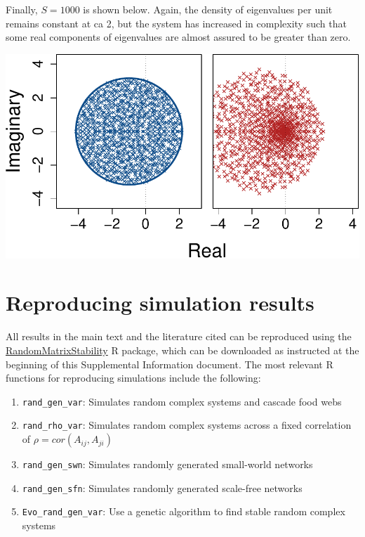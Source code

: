 \documentclass[]{article}
\providecommand{\tightlist}{%
  \setlength{\itemsep}{0pt}\setlength{\parskip}{0pt}}
\begin{document}
Finally, \(S = 1000\) is shown below. Again, the density of eigenvalues
per unit remains constant at ca 2, but the system has increased in
complexity such that some real components of eigenvalues are almost
assured to be greater than zero.

\includegraphics{SI_files/figure-latex/unnamed-chunk-44-1.pdf}

\clearpage

\hypertarget{repr}{\section{Reproducing simulation results}\label{repr}}

All results in the main text and the literature cited can be reproduced
using the
\href{https://github.com/bradduthie/RandomMatrixStability}{RandomMatrixStability}
R package, which can be downloaded as instructed at the beginning of
this Supplemental Information document. The most relevant R functions
for reproducing simulations include the following:

\begin{enumerate}
\def\labelenumi{\arabic{enumi}.}
\tightlist
\item
  \texttt{rand\_gen\_var}: Simulates random complex systems and cascade
  food webs
\item
  \texttt{rand\_rho\_var}: Simulates random complex systems across a
  fixed correlation of \(\rho = cor(A_{ij}, A_{ji})\)
\item
  \texttt{rand\_gen\_swn}: Simulates randomly generated small-world
  networks
\item
  \texttt{rand\_gen\_sfn}: Simulates randomly generated scale-free
  networks
\item
  \texttt{Evo\_rand\_gen\_var}: Use a genetic algorithm to find stable
  random complex systems
\end{enumerate}
\end{document}
